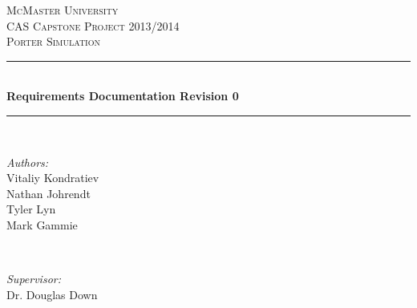 \documentclass[paper=letter, fontsize=10pt]{scrartcl}
\numberwithin{equation}{section}		%
\numberwithin{figure}{section}			%
\numberwithin{table}{section}				%
\begin{document}
\begin{titlepage}

\newcommand{\HRule}{\rule{\linewidth}{0.5mm}} %

\begin{center}
 

\textsc{\LARGE McMaster University}\\[1.5cm] %
\textsc{\Large CAS Capstone Project 2013/2014}\\[0.5cm] %
\textsc{\large Porter Simulation}\\[0.5cm] %


\HRule \\[0.4cm]
{ \huge \bfseries Requirements Documentation Revision 0}\\[0.4cm] %
\HRule \\[1.5cm]
 

\begin{minipage}{0.4\textwidth}
\begin{flushleft} \large
\emph{Authors:}\\
Vitaliy Kondratiev\\
Nathan Johrendt\\
Tyler Lyn\\
Mark Gammie
\end{flushleft}
\end{minipage}
~
\begin{minipage}{0.4\textwidth}
\begin{flushright} \large
\emph{Supervisor:} \\
Dr. Douglas Down %
\end{flushright}
\end{minipage}\\[4cm]


\end{center}
\end{titlepage}
\end{document}
